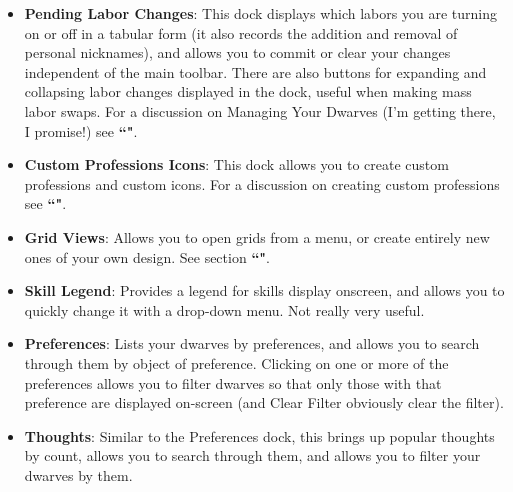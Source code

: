 \documentclass[]{article}
\begin{document}
\begin{itemize}
\item \textbf{Pending Labor Changes}: This dock displays which labors you are turning on or off in a
tabular form (it also records the addition and removal of personal nicknames), and allows you to commit
or clear your changes independent of the main toolbar. There are also buttons for expanding and
collapsing labor changes displayed in the dock, useful when making mass labor swaps. For a discussion on
Managing Your Dwarves (I'm getting there, I promise!) see \textbf{``"}.
\item \textbf{Custom Professions Icons}: This dock allows you to create custom professions and custom
icons. For a discussion on creating custom professions see \textbf{``"}.
\item \textbf{Grid Views}: Allows you to open grids from a menu, or create entirely new ones of your own
design. See section \textbf{``"}.
\item \textbf{Skill Legend}: Provides a legend for skills display onscreen, and allows you to quickly
change it with a drop-down menu. Not really very useful.
\item \textbf{Preferences}: Lists your dwarves by preferences, and allows you to search through them by
object of preference. Clicking on one or more of the preferences allows you to filter dwarves so that
only those with that preference are displayed on-screen (and Clear Filter obviously clear the filter).
\item \textbf{Thoughts}: Similar to the Preferences dock, this brings up popular thoughts by count,
allows you to search through them, and allows you to filter your dwarves by them.


\end{itemize}
\end{document}
